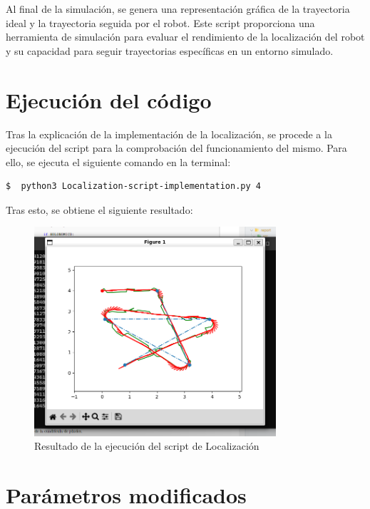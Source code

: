 \documentclass[11pt]{report}
\begin{document}
Al final de la simulación, se genera una representación gráfica de la trayectoria ideal y la trayectoria seguida por el robot. Este script proporciona una herramienta de simulación para evaluar el rendimiento de la localización del robot y su capacidad para seguir trayectorias específicas en un entorno simulado.

\section{Ejecución del código}

Tras la explicación de la implementación de la localización, se procede a la ejecución del script para la comprobación del funcionamiento del mismo. Para ello, se ejecuta el siguiente comando en la terminal:

\begin{lstlisting}[style=bash, caption={Ejecución del script de Localización}, label=bash]
  $  python3 Localization-script-implementation.py 4
\end{lstlisting}

Tras esto, se obtiene el siguiente resultado:

\begin{figure}[H]
    \centering
    \includegraphics[width=0.8\textwidth]{src/img/Localization-Result.png}
    \caption{Resultado de la ejecución del script de Localización}
    \label{fig:localization-script-implementation}
\end{figure}

\section{Parámetros modificados}
\end{document}
